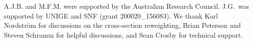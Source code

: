 A.J.B. and M.F.M. were supported by the Australian Research Council. J.G.~was supported by UNIGE and SNF (grant 200020\_156083). We thank Karl Nordstr{\"o}m for discussions on the cross-section reweighting, Brian Peterson and Steven Schramm for helpful discussions, and Sean Crosby for technical support.